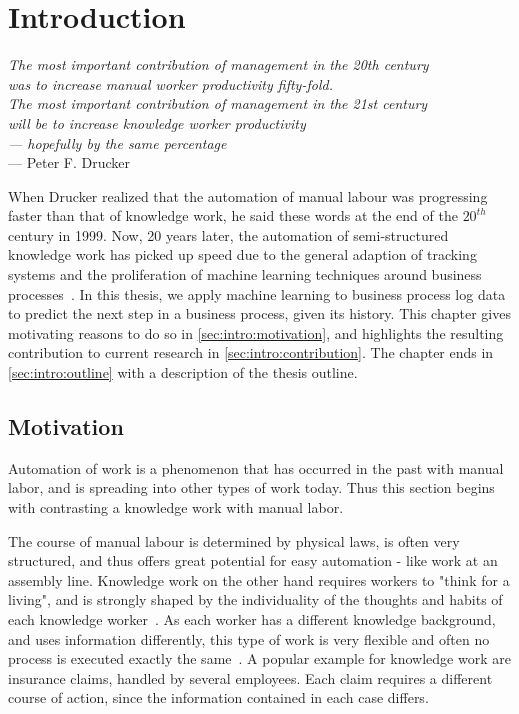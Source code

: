 \chapter{Introduction}\label{sec:intro}
\begin{flushright}{\slshape    
The most important contribution of management in the 20th century\\
was to increase manual worker productivity fifty-fold.\\
The most important contribution of management in the 21st century\\
will be to increase knowledge worker productivity\\
— hopefully by the same percentage} \\ \medskip
--- Peter F. Drucker~\cite{drucker1999}
\end{flushright}

When Drucker realized that the automation of manual labour was progressing faster than that of knowledge work, he said these words at the end of the $20^{th}$ century in 1999. Now, 20 years later, the automation of semi-structured knowledge work has picked up speed due to the general adaption of tracking systems and the proliferation of machine learning techniques around business processes~\cite{boehmer2018probability, klinkmuller2018reliablemonitoring}.
In this thesis, we apply machine learning to business process log data to predict the next step in a business process, given its history. This chapter gives motivating reasons to do so in \autoref{sec:intro:motivation}, and highlights the resulting contribution to current research in \autoref{sec:intro:contribution}. The chapter ends in \autoref{sec:intro:outline} with a description of the thesis outline.

\section{Motivation} \label{sec:intro:motivation}
Automation of work is a phenomenon that has occurred in the past with manual labor, and is spreading into other types of work today. Thus this section begins with contrasting a knowledge work with manual labor.

The course of manual labour is determined by physical laws, is often very structured, and thus offers great potential for easy automation - like work at an assembly line. Knowledge work on the other hand requires workers to "think for a living", and is strongly shaped by the individuality of the thoughts and habits of each knowledge worker~\cite{drucker1999}. As each worker has a different knowledge background, and uses information differently, this type of work is very flexible and often no process is executed exactly the same~\cite{hewelt2016}. A popular example for knowledge work are insurance claims, handled by several employees. Each claim requires a different course of action, since the information contained in each case differs.\\

